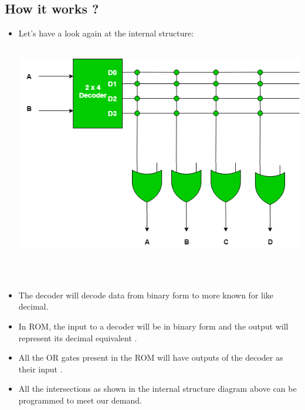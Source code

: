 \documentclass [12pt]{article}
\begin{document}
		\subsection {How it works ?}
			\begin {itemize}
				\item Let's have a look again at the internal structure: \\~\\
				\centerline{\includegraphics[scale = 0.5]{rom_internal.png}} \\~\\
				
				\item The decoder will decode data from binary form to more known for like decimal.
				
				\item In ROM, the input to a decoder will be in binary form and the output will represent its decimal equivalent .
				
				\item All the OR gates present in the ROM will have outputs of the decoder as their input .
				
				\item All the intersections as shown in the internal structure diagram above can be programmed to meet our demand.
			\end {itemize}
\end{document}

